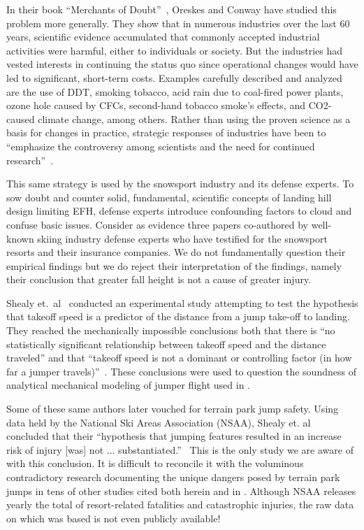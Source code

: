 \documentclass[smallextended]{svjour3}       %
\begin{document}
In their book ``Merchants of Doubt''~\cite{Oreskes2010}, Oreskes and Conway
have studied this problem more generally. They show that in numerous industries
over the last 60 years, scientific evidence accumulated that commonly accepted
industrial activities were harmful, either to individuals or society. But the
industries had vested interests in continuing the status quo since operational
changes would have led to significant, short-term costs. Examples carefully
described and analyzed~\cite{Oreskes2010} are the use of DDT, smoking tobacco,
acid rain due to coal-fired power plants, ozone hole caused by CFCs,
second-hand tobacco smoke’s effects, and CO2-caused climate change, among
others. Rather than using the proven science as a basis for changes in
practice, strategic responses of industries have been to ``emphasize the
controversy among scientists and the need for continued
research''~\cite{Oreskes2010}.

This same strategy is used by the snowsport industry and its defense experts.
To sow doubt and counter solid, fundamental, scientific concepts of landing
hill design limiting EFH, defense experts introduce confounding factors to
cloud and confuse basic issues. Consider as evidence three papers
\cite{Shealy2010,Shealy2015,Scher2015} co-authored by well-known skiing
industry defense experts who have testified for the snowsport resorts and their
insurance companies. We do not fundamentally question their empirical findings but we do reject their interpretation of the findings, namely their conclusion that greater fall height is not a cause of greater injury.

Shealy et.~al~\cite{Shealy2010} conducted an experimental study attempting to
test the hypothesis that takeoff speed is a predictor of the distance from a
jump take-off to landing. They reached the mechanically impossible conclusions
both that there is ``no statistically significant relationship between takeoff
speed and the distance traveled'' and that ``takeoff speed is not a dominant or
controlling factor (in how far a jumper travels)''~\cite{Shealy2010}. These
conclusions were used to question the soundness of analytical mechanical
modeling of jumper flight used in \cite{Hubbard2009,McNeil2012}.

Some of these same authors later vouched for terrain park jump safety. Using
data held by the National Ski Areas Association (NSAA), Shealy et.
al~\cite{Shealy2015} concluded that their ``hypothesis that jumping features
resulted in an increase risk of injury [was] not ...
substantiated.''~\cite{Shealy2015} This is the only study we are aware of with
this conclusion. It is difficult to reconcile it with the voluminous
contradictory research documenting the unique dangers posed by terrain park
jumps in tens of other studies cited both herein and in
\cite{Hubbard2009,Swedberg2012,McNeil2012,McNeil2012a,Hubbard2015,Levy2015,Petrone2017,Moore2018}.
Although NSAA releases yearly the total of resort-related fatalities and
catastrophic injuries, the raw data on which \cite{Shealy2015} was based is not
even publicly available!
\end{document}
